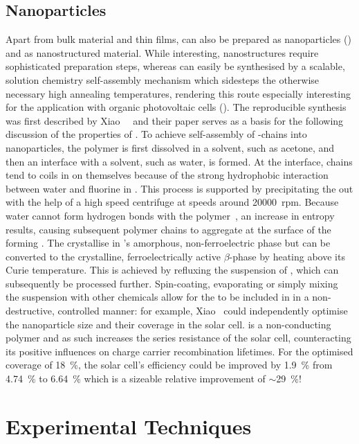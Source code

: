 \subsection{\pvdf{} Nanoparticles}
Apart from bulk material and thin films, \pvdf{} can also be prepared as nanoparticles (\nps{}) and as nanostructured material. While interesting, \pvdf{} nanostructures require sophisticated preparation steps, whereas \pvdf{} \nps{} can easily be synthesised by a scalable, solution chemistry self-assembly mechanism which sidesteps the otherwise necessary high annealing temperatures, rendering this route especially interesting for the application with organic photovoltaic cells (\opvs{}). The reproducible synthesis was first described by Xiao~\etal{}~\cite{NPsynthesis} and their paper serves as a basis for the following discussion of the properties of \pvdf{} \nps{}. To achieve self-assembly of \pvdf{}-chains into nanoparticles, the polymer is first dissolved in a  solvent, such as acetone, and then an interface with a  solvent, such as water, is formed. At the interface, \pvdf{} chains tend to coils in on themselves because of the strong hydrophobic interaction between water and fluorine in \pvdf{}. This process is supported by precipitating the \nps{} out with the help of a high speed centrifuge at speeds around \SI{20000}{rpm}. Because water cannot form hydrogen bonds with the polymer~\cite{silverstein}, an increase in entropy results, causing subsequent polymer chains to aggregate at the surface of the forming \np{}. The \nps{} crystallise in \pvdf{}'s amorphous, non-ferroelectric phase but can be converted to the crystalline, ferroelectrically  active $\beta$-phase by heating above its Curie temperature. This is achieved by refluxing the suspension of \nps{}, which can subsequently be processed further. Spin-coating, evaporating or simply mixing the suspension with other chemicals allow for the \nps{} to be included in \opvs{} in a non-destructive, controlled manner: for example, Xiao~\etal{} could independently optimise the nanoparticle size and their coverage in the solar cell. \pvdf{} is a non-conducting polymer and as such increases the series resistance of the solar cell, counteracting its positive influences on charge carrier recombination lifetimes. For the optimised coverage of \SI{18}{\percent}, the solar cell's efficiency could be improved by \SI{1.9}{\percent} from \SI{4.74}{\percent} to \SI{6.64}{\percent} which is a sizeable relative improvement of $\sim$\SI{29}{\percent}!

\section{Experimental Techniques}
\label{sec:exptech}
